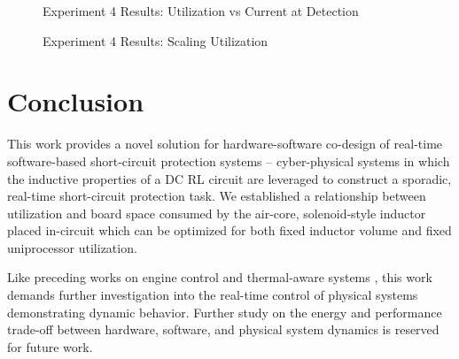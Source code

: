 \documentclass[11pt,oneside]{report}
\begin{document}
    \begin{figure}
        \centering
           \caption{Experiment 4 Results: Scaling Utilization}Experiment 4 Results: Utilization vs Current at Detection
        \label{fig:ScalingUtilization}
    \end{figure}

    \chapter{Conclusion} \label{chap:conclusion}
    This work provides a novel solution for hardware-software co-design of real-time software-based short-circuit protection systems -- cyber-physical systems in which the inductive properties of a DC RL circuit are leveraged to construct a sporadic, real-time short-circuit protection task. We established a relationship between utilization and board space consumed by the air-core, solenoid-style inductor placed in-circuit which can be optimized for both fixed inductor volume and fixed uniprocessor utilization.
    
    Like preceding works on engine control \cite{engineCtrl} and thermal-aware systems \cite{thermalAware}, this work demands further investigation into the real-time control of physical systems demonstrating dynamic behavior. Further study on the energy and performance trade-off between hardware, software, and physical system dynamics is reserved for future work.
    
\end{document}

